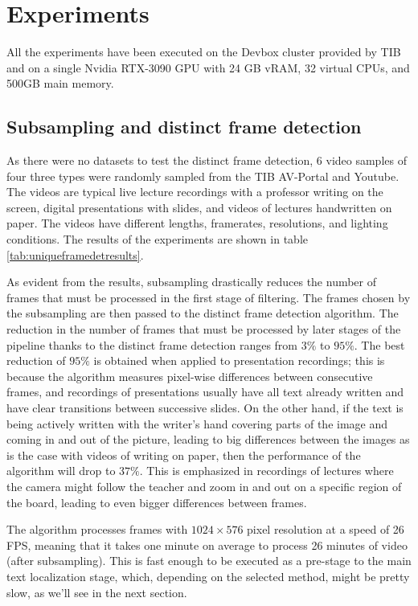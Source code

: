 \chapter{Experiments}

All the experiments have been executed on the Devbox cluster provided by TIB and on a single Nvidia RTX-3090 GPU with 24 GB vRAM, 32 virtual CPUs, and 500GB main memory. 

\section{Subsampling and distinct frame detection}

As there were no datasets to test the distinct frame detection, 6 video samples of four three types were randomly sampled from the TIB AV-Portal \cite{noauthor_tib_nodate} and Youtube. The videos are typical live lecture recordings with a professor writing on the screen, digital presentations with slides, and videos of lectures handwritten on paper. The videos have different lengths, framerates, resolutions, and lighting conditions. The results of the experiments are shown in table \ref{tab:uniqueframedetresults}.



As evident from the results, subsampling drastically reduces the number of frames that must be processed in the first stage of filtering. The frames chosen by the subsampling are then passed to the distinct frame detection algorithm. The reduction in the number of frames that must be processed by later stages of the pipeline thanks to the distinct frame detection ranges from $3\%$ to $95\%$. The best reduction of $95\%$ is obtained when applied to presentation recordings; this is because the algorithm measures pixel-wise differences between consecutive frames, and recordings of presentations usually have all text already written and have clear transitions between successive slides. On the other hand, if the text is being actively written with the writer's hand covering parts of the image and coming in and out of the picture, leading to big differences between the images as is the case with videos of writing on paper, then the performance of the algorithm will drop to $37\%$. This is emphasized in recordings of lectures where the camera might follow the teacher and zoom in and out on a specific region of the board, leading to even bigger differences between frames.

The algorithm processes frames with $1024\times576$ pixel resolution at a speed of 26 FPS, meaning that it takes one minute on average to process 26 minutes of video (after subsampling). This is fast enough to be executed as a pre-stage to the main text localization stage, which, depending on the selected method, might be pretty slow, as we'll see in the next section.

